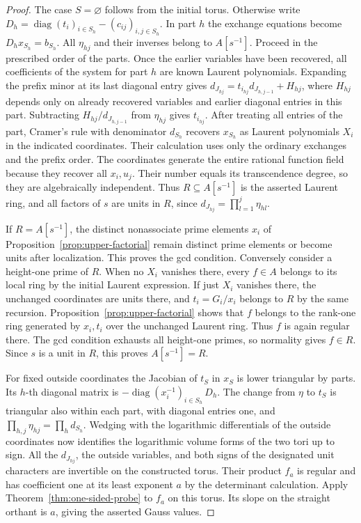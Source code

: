 \documentclass[11pt,reqno]{amsart}
\numberwithin{equation}{section}
\theoremstyle{definition}
\theoremstyle{remark}
\begin{document}
\begin{proof}
The case \(S=\varnothing\) follows from the initial torus. Otherwise
write \(D_h=\operatorname{diag}(t_i)_{i\in S_h}-(c_{ij})_{i,j\in S_h}\).
In part \(h\) the exchange equations become \(D_hx_{S_h}=b_{S_h}\).
All \(\eta_{hj}\) and their inverses belong to \(A[s^{-1}]\).
Proceed in the prescribed order of the parts. Once the earlier
variables have been recovered, all coefficients of the system for
part \(h\) are known Laurent polynomials. Expanding the prefix minor
at its last diagonal entry gives
\(d_{J_{hj}}=t_{i_{hj}}d_{J_{h,j-1}}+H_{hj}\), where \(H_{hj}\)
depends only on already recovered variables and earlier diagonal
entries in this part. Subtracting \(H_{hj}/d_{J_{h,j-1}}\) from
\(\eta_{hj}\) gives \(t_{i_{hj}}\). After treating all entries of
the part, Cramer's rule with denominator \(d_{S_h}\) recovers
\(x_{S_h}\) as Laurent polynomials \(X_i\) in the indicated
coordinates. Their calculation uses only the ordinary exchanges and
the prefix order. The coordinates generate the entire rational
function field because they recover all \(x_i,u_j\). Their number
equals its transcendence degree, so they are algebraically independent.
Thus \(R\subseteq A[s^{-1}]\) is the asserted Laurent ring, and
all factors of \(s\) are units in \(R\), since
\(d_{J_{hj}}=\prod_{l=1}^j\eta_{hl}\).

If \(R=A[s^{-1}]\), the distinct nonassociate prime elements
\(x_i\) of Proposition~\ref{prop:upper-factorial} remain distinct
prime elements or become units after localization. This proves the
gcd condition. Conversely consider a height-one prime of \(R\).
When no \(X_i\) vanishes there, every \(f\in A\) belongs to its
local ring by the initial Laurent expression. If just \(X_i\)
vanishes there, the unchanged coordinates are units there, and
\(t_i=G_i/x_i\) belongs to \(R\) by the same recursion.
Proposition~\ref{prop:upper-factorial} shows that \(f\) belongs to the rank-one
ring generated by \(x_i,t_i\) over the unchanged Laurent ring.
Thus \(f\) is again regular there. The gcd condition exhausts all
height-one primes, so normality gives \(f\in R\). Since \(s\) is
a unit in \(R\), this proves \(A[s^{-1}]=R\).

For fixed outside coordinates the Jacobian of \(t_S\) in \(x_S\)
is lower triangular by parts. Its \(h\)-th diagonal matrix is
\(-\operatorname{diag}(x_i^{-1})_{i\in S_h}\,D_h\).
The change from \(\eta\) to \(t_S\) is triangular also within each
part, with diagonal entries one, and
\(\prod_{h,j}\eta_{hj}=\prod_h d_{S_h}\). Wedging with the
logarithmic differentials of the outside coordinates now identifies
the logarithmic volume forms of the two tori up to sign. All the
\(d_{J_{hj}}\), the outside variables, and both signs of the
designated unit characters are invertible on the constructed torus.
Their product \(f_a\) is regular and has coefficient one at its
least exponent \(a\) by the determinant calculation. Apply
Theorem~\ref{thm:one-sided-probe} to \(f_a\) on this torus. Its
slope on the straight orthant is \(a\), giving the asserted Gauss
values.
\end{proof}
\end{document}
